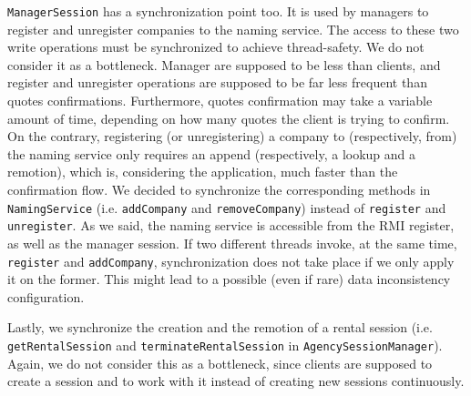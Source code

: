 \texttt{ManagerSession} has a synchronization point too. It is used by managers to register and unregister companies to the naming service. The access to these two write operations must be synchronized to achieve thread-safety. We do not consider it as a bottleneck. Manager are supposed to be less than clients, and register and unregister operations are supposed to be far less frequent than quotes confirmations. Furthermore, quotes confirmation may take a variable amount of time, depending on how many quotes the client is trying to confirm. On the contrary, registering (or unregistering) a company to (respectively, from) the naming service only requires an append (respectively, a lookup and a remotion), which is, considering the application, much faster than the confirmation flow. We decided to synchronize the corresponding methods in \texttt{NamingService} (i.e. \texttt{addCompany} and \texttt{removeCompany}) instead of \texttt{register} and \texttt{unregister}. As we said, the naming service is accessible from the RMI register, as well as the manager session. If two different threads invoke, at the same time, \texttt{register} and \texttt{addCompany}, synchronization does not take place if we only apply it on the former. This might lead to a possible (even if rare) data inconsistency configuration. 

Lastly, we synchronize the creation and the remotion of a rental session (i.e. \texttt{getRentalSession} and \texttt{terminateRentalSession} in \texttt{AgencySessionManager}). Again, we do not consider this as a bottleneck, since clients are supposed to create a session and to work with it instead of creating new sessions continuously.


